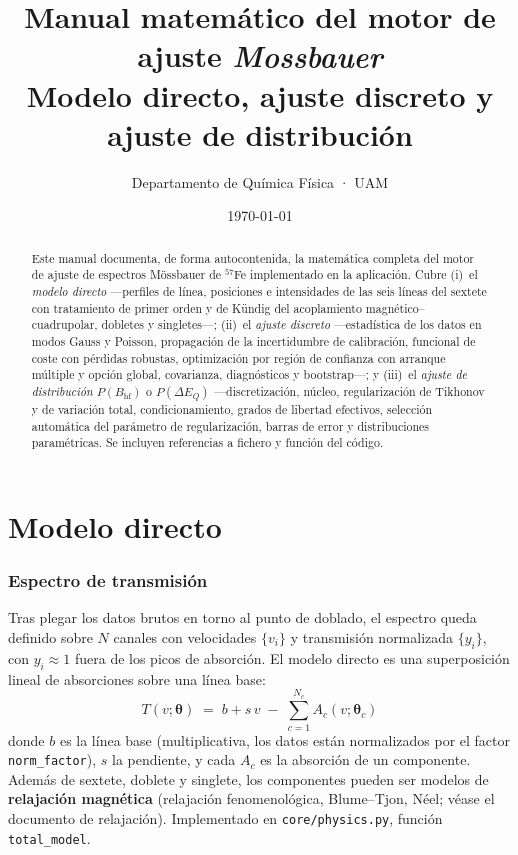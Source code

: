 \documentclass[11pt,a4paper]{article}
\title{\textbf{Manual matemático del motor de ajuste \emph{Mossbauer}}\\[3pt]
\large Modelo directo, ajuste discreto y ajuste de distribución}
\author{Departamento de Química Física · UAM}
\date{\today}
\newcommand{\BHF}{B_{\mathrm{hf}}}
\newcommand{\dEQ}{\Delta E_{Q}}
\newcommand{\code}[1]{\texttt{\small #1}}
\newcommand{\file}[1]{\textcolor{black!70}{\texttt{\small #1}}}
\begin{document}
\maketitle

\begin{abstract}\noindent
Este manual documenta, de forma autocontenida, la matemática completa del motor de
ajuste de espectros Mössbauer de $^{57}$Fe implementado en la aplicación. Cubre
(i)~el \emph{modelo directo} —perfiles de línea, posiciones e intensidades de las
seis líneas del sextete con tratamiento de primer orden y de Kündig del
acoplamiento magnético–cuadrupolar, dobletes y singletes—; (ii)~el \emph{ajuste
discreto} —estadística de los datos en modos Gauss y Poisson, propagación de la
incertidumbre de calibración, funcional de coste con pérdidas robustas,
optimización por región de confianza con arranque múltiple y opción global,
covarianza, diagnósticos y bootstrap—; y (iii)~el \emph{ajuste de distribución}
$P(\BHF)$ o $P(\dEQ)$ —discretización, núcleo, regularización de Tikhonov y de
variación total, condicionamiento, grados de libertad efectivos, selección
automática del parámetro de regularización, barras de error y distribuciones
paramétricas. Se incluyen referencias a fichero y función del código.
\end{abstract}

\tableofcontents
\bigskip

\part{Modelo directo}

\section{Espectro de transmisión}\label{sec:fwd}

Tras plegar los datos brutos en torno al punto de doblado, el espectro queda
definido sobre $N$ canales con velocidades $\{v_i\}$ y transmisión normalizada
$\{y_i\}$, con $y_i\approx 1$ fuera de los picos de absorción. El modelo directo
es una superposición lineal de absorciones sobre una línea base:
\begin{equation}
  \boxed{\;
  T(v;\bm\theta) \;=\; b + s\,v \;-\; \sum_{c=1}^{N_c} A_c(v;\bm\theta_c)
  \;}
  \label{eq:Tmodel}
\end{equation}
donde $b$ es la línea base (multiplicativa, los datos están normalizados por el
factor \code{norm\_factor}), $s$ la pendiente, y cada $A_c$ es la absorción de un
componente. Además de sextete, doblete y singlete, los componentes pueden ser
modelos de \textbf{relajación magnética} (relajación fenomenológica, Blume--Tjon,
Néel; véase el documento de relajación). Implementado en \file{core/physics.py},
función \code{total\_model}.
\end{document}
